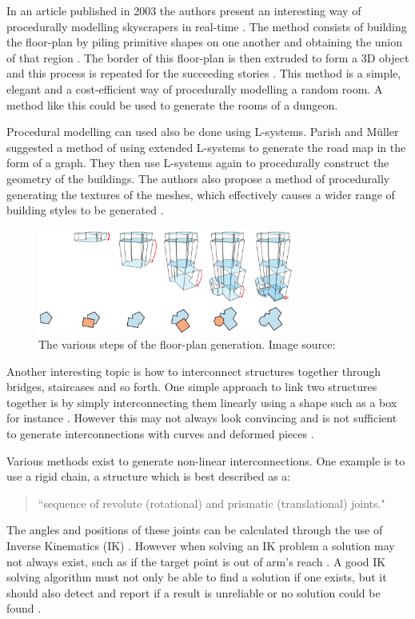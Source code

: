 In an article published in 2003 the authors present an interesting way of procedurally modelling skyscrapers in real-time \citep{DBLP:conf/graphite/GreuterPSL03}. The method consists of building the floor-plan by piling primitive shapes on one another and obtaining the union of that region \citep{DBLP:conf/graphite/GreuterPSL03}. The border of this floor-plan is then extruded to form a 3D object and this process is repeated for the succeeding stories \citep{DBLP:conf/graphite/GreuterPSL03}. This method is a simple, elegant and a cost-efficient way of procedurally modelling a random room. A method like this could be used to generate the rooms of a dungeon.

Procedural modelling can used also be done using L-systems. Parish and M\"uller suggested a method of using extended L-systems to generate the road map in the form of a graph. They then use L-systems again to procedurally construct the geometry of the buildings. The authors also propose a method of procedurally generating the textures of the meshes, which effectively causes a wider range of building styles to be generated \citep{Parish:2001:PMC:383259.383292}.

\begin{figure}[h!]
  \centering
    \includegraphics[width=0.75\textwidth]{images/floorplan.png}
  \caption{The various steps of the floor-plan generation. Image source: \citep{DBLP:conf/graphite/GreuterPSL03}}
\end{figure}

Another interesting topic is how to interconnect structures together through bridges, staircases and so forth. One simple approach to link two structures together is by simply interconnecting them linearly using a shape such as a box for instance \citep{DBLP:journals/cgf/KrecklauK11}. However this may not always look convincing and is not sufficient to generate interconnections with curves and deformed pieces \citep{DBLP:journals/cgf/KrecklauK11}. 

Various methods exist to generate non-linear interconnections. One example is to use a rigid chain, a structure which is best described as a:
\begin{quote}
``sequence of revolute (rotational) and prismatic (translational) joints." \citep{DBLP:journals/cgf/KrecklauK11}
\end{quote}
The angles and positions of these joints can be calculated through the use of Inverse Kinematics (IK) \citep{DBLP:journals/cgf/KrecklauK11}. However when solving an IK problem a solution may not always exist, such as if the target point is out of arm's reach \citep{Tolani2000353}. A good IK solving algorithm must not only be able to find a solution if one exists, but it should also detect and report if a result is unreliable or no solution could be found \citep{Tolani2000353}.

